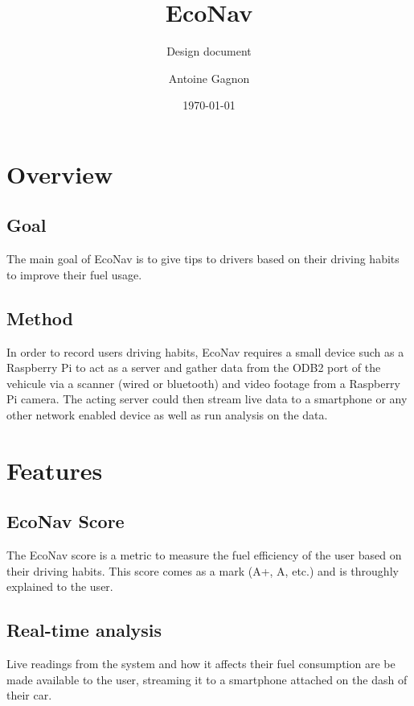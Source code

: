\documentclass[a4paper,12pt]{article}
\title{\textbf{EcoNav}}
\subtitle{Design document}
\author{Antoine Gagnon}
\date{\today}
\begin{document}
\clearpage\maketitle
\thispagestyle{empty}

\pagebreak

\tableofcontents

\pagebreak

\section{Overview}

\subsection{Goal}

The main goal of EcoNav is to give tips to drivers based on their driving habits to improve their fuel usage.

\subsection{Method}

In order to record users driving habits, EcoNav requires a small device such as a Raspberry Pi to act as a server and gather data from the ODB2 port of the vehicule via a scanner (wired or bluetooth) and video footage from a Raspberry Pi camera. The acting server could then stream live data to a smartphone or any other network enabled device as well as run analysis on the data. 


\pagebreak

\section{Features}

\subsection{EcoNav Score}
The EcoNav score is a metric to measure the fuel efficiency of the user based on their driving habits. This score comes as a mark (A+, A, etc.) and is throughly explained to the user.

\subsection{Real-time analysis}
Live readings from the system and how it affects their fuel consumption are be made available to the user, streaming it to a smartphone attached on the dash of their car.
\end{document}
